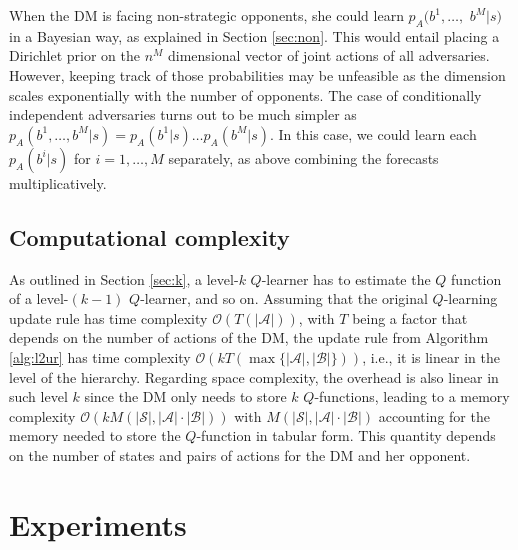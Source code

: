 When the DM is facing non-strategic opponents, she could learn $p_A(b^1, \dots,$ $ b^M \vert s)$ in a Bayesian way, as explained in Section \ref{sec:non}. This would entail placing a Dirichlet prior on the $n^M$ dimensional vector of joint actions of all adversaries. However, keeping track of those probabilities may be unfeasible as the dimension scales exponentially with the number of opponents. The case  of conditionally independent adversaries turns out to be much simpler as
$p_A(b^1, \dots, b^M \vert s) = p_A(b^1 \vert s) \dots p_A(b^M \vert s)$. In this case, we could learn each $p_A(b^i \vert s)$ for $i=1, \dots, M$ separately, as above combining the forecasts  
multiplicatively.

\subsection{Computational complexity}\label{sec:cc}

As outlined in Section \ref{sec:k}, a level-$k$ $Q$-learner has to estimate the $Q$ function
of a level-$(k-1)$ $Q$-learner, and so on. Assuming that the original $Q$-learning 
update rule has time complexity $\mathcal{O}(T(|\mathcal{A}|))$, with $T$ being a factor that depends on the number of actions of the DM, the update rule from 
Algorithm \ref{alg:l2ur} has time complexity $\mathcal{O}(kT(\max \lbrace |\mathcal{A}|,  |\mathcal{B}|\rbrace))$, i.e.,
it is linear in the level of the hierarchy. %
Regarding space complexity, the overhead is also linear in such level $k$ since the DM only needs to store $k$ $Q$-functions, leading to a memory complexity $\mathcal{O}(kM(|\mathcal{S}|,|\mathcal{A}| \cdot |\mathcal{B}|))$ with $M(|\mathcal{S}|,|\mathcal{A}| \cdot |\mathcal{B}|)$ accounting for the memory needed to store the $Q$-function in tabular form. This quantity depends on the number of states and pairs of actions for the DM and her opponent.



\section{Experiments}\label{sec:exps_ararl}

